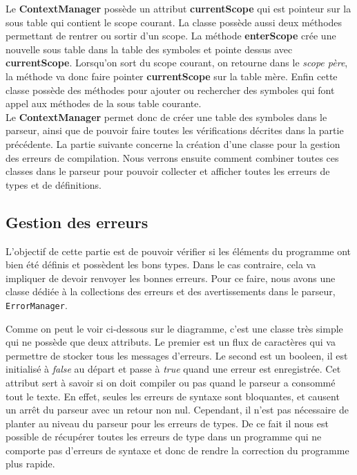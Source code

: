 \documentclass[a4paper]{article}%
\begin{document}
Le \textbf{ContextManager} possède un attribut \textbf{currentScope} qui est pointeur sur
la sous table qui contient le scope courant. La classe possède aussi deux
méthodes permettant de rentrer ou sortir d'un scope. La méthode
\textbf{enterScope} crée une nouvelle sous table dans la table des symboles et
pointe dessus avec \textbf{currentScope}. Lorsqu'on sort du scope courant, on
retourne dans le \textit{scope père}, la méthode va donc faire pointer
\textbf{currentScope} sur la table mère. Enfin cette classe possède des méthodes
pour ajouter ou rechercher des symboles qui font appel aux méthodes de la sous
table courante.\\

Le \textbf{ContextManager} permet donc de créer une table des symboles dans le
parseur, ainsi que de pouvoir faire toutes les vérifications décrites dans la
partie précédente. La partie suivante concerne la création d'une classe pour la
gestion des erreurs de compilation. Nous verrons ensuite comment combiner toutes
ces classes dans le parseur pour pouvoir collecter et afficher toutes les
erreurs de types et de définitions.

\subsection{Gestion des erreurs}

L'objectif de cette partie est de pouvoir vérifier si les éléments du programme
ont bien été définis et possèdent les bons types. Dans le cas contraire, cela va
impliquer de devoir renvoyer les bonnes erreurs. Pour ce faire, nous avons une
classe dédiée à la collections des erreurs et des avertissements dans le
parseur, \lstinline{ErrorManager}.

Comme on peut le voir ci-dessous sur le diagramme, c'est une classe très simple
qui ne possède que deux attributs. Le premier est un flux de caractères qui va
permettre de stocker tous les messages d'erreurs. Le second est un booleen, il
est initialisé à \textit{false} au départ et passe à \textit{true} quand une
erreur est enregistrée. Cet attribut sert à savoir si on doit compiler ou pas
quand le parseur a consommé tout le texte. En effet, seules les erreurs de
syntaxe sont bloquantes, et causent un arrêt du parseur avec un retour non nul.
Cependant, il n'est pas nécessaire de planter au niveau du parseur pour les
erreurs de types. De ce fait il nous est possible de récupérer toutes les
erreurs de type dans un programme qui ne comporte pas d'erreurs de syntaxe et
donc de rendre la correction du programme plus rapide.
\end{document}
